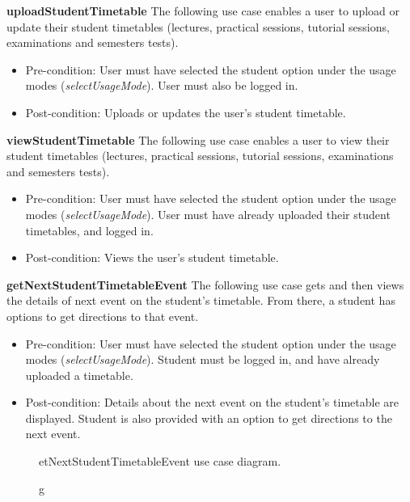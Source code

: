 \documentclass[12pt,a4paper]{article}
\begin{document}
	    \medskip
	    
	    \textbf{uploadStudentTimetable}
		The following use case enables a user to upload or update their student timetables (lectures, practical sessions, 			    tutorial sessions, examinations and semesters tests).
			
		\begin{itemize}
		  \item Pre-condition: User must have selected the student option under the usage modes (\textit{selectUsageMode}). 					User must also be logged in.
		   \item Post-condition: Uploads or updates the user's student timetable.
		\end{itemize}
		
	    \textbf{viewStudentTimetable}
		The following use case enables a user to view their student timetables (lectures, practical sessions, tutorial        			sessions, examinations and semesters tests).
			
		\begin{itemize}
		  \item Pre-condition: User must have selected the student option under the usage modes (\textit{selectUsageMode}). 					User must have already uploaded their student timetables, and logged in.
		   \item Post-condition: Views the user's student timetable.
		\end{itemize}
		
	    \textbf{getNextStudentTimetableEvent}
		The following use case gets and then views the details of next event on the student's timetable. From there, a student 		has options to get directions to that event.
			
		\begin{itemize}
		  \item Pre-condition: User must have selected the student option under the usage modes (\textit{selectUsageMode}). 					Student must be logged in, and have already uploaded a timetable.
		   \item Post-condition: Details about the next event on the student's timetable are displayed. Student is also 						 provided with an option to get directions to the next event.
		\end{itemize}
		
		\begin{figure}[h!]
				\caption getNextStudentTimetableEvent use case diagram.
		\end{figure}
		
\end{document}
